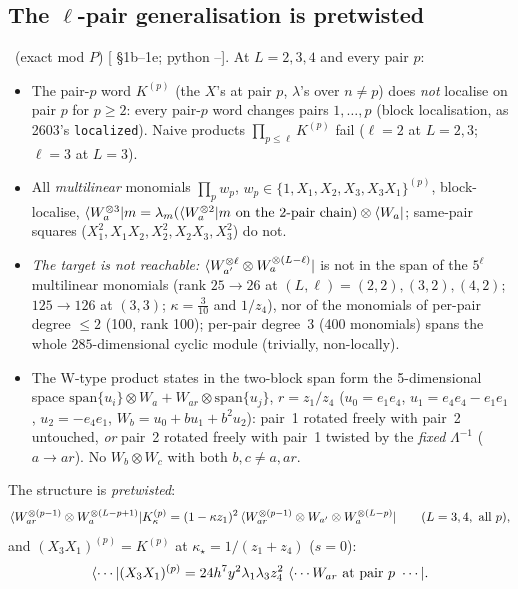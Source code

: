 \subsection{The $\ell$-pair generalisation is pretwisted}\label{sec:kappa-lpairs}

\ex\ (exact mod $P$) [ \S1b--1e; python --]. At $L=2,3,4$ and every pair $p$:
\begin{itemize}
\item The pair-$p$ word $K^{(p)}$ (the $X$'s at pair $p$, $\lambda$'s over $n\ne p$) does \emph{not} localise on pair $p$ for $p\ge2$: every pair-$p$ word changes pairs $1,\dots,p$ (block localisation, as 2603's \texttt{localized}). Naive products $\prod_{p\le\ell}K^{(p)}$ fail ($\ell=2$ at $L=2,3$; $\ell=3$ at $L=3$).
\item All \emph{multilinear} monomials $\prod_pw_p$, $w_p\in\{1,X_1,X_2,X_3,X_3X_1\}^{(p)}$, block-localise, $\bra{W_a^{\otimes3}}m=\lambda_m(\bra{W_a^{\otimes2}}m\ \text{on the 2-pair chain})\otimes\bra{W_a}$; same-pair squares ($X_1^2,X_1X_2,X_2^2,X_2X_3,X_3^2$) do not.
\item \emph{The target is not reachable:} $\langle W_{a'}^{\otimes\ell}\otimes W_a^{\otimes(L-\ell)}|$ is not in the span of the $5^\ell$ multilinear monomials (rank $25\to26$ at $(L,\ell)=(2,2),(3,2),(4,2)$; $125\to126$ at $(3,3)$; $\kappa=\tfrac3{10}$ and $1/z_4$), nor of the monomials of per-pair degree $\le2$ (100, rank 100); per-pair degree~3 (400 monomials) spans the whole $285$-dimensional cyclic module (trivially, non-locally).
\item The W-type product states in the two-block span form the 5-dimensional space $\mathrm{span}\{u_i\}\otimes W_a+W_{ar}\otimes\mathrm{span}\{u_j\}$, $r=z_1/z_4$ ($u_0=e_1e_4$, $u_1=e_4e_4-e_1e_1$, $u_2=-e_4e_1$, $W_b=u_0+bu_1+b^2u_2$): pair~1 rotated freely with pair~2 untouched, \emph{or} pair~2 rotated freely with pair~1 twisted by the \emph{fixed} $\Lambda^{-1}$ ($a\to ar$). No $W_b\otimes W_c$ with both $b,c\ne a,ar$.
\end{itemize}
The structure is \emph{pretwisted}:
\begin{equation}\label{eq:kappa-pretw}
 \langle W_{ar}^{\otimes(p-1)}\otimes W_a^{\otimes(L-p+1)}|K^{(p)}_\kappa=(1-\kappa z_1)^2\,\langle W_{ar}^{\otimes(p-1)}\otimes W_{a'}\otimes W_a^{\otimes(L-p)}|\qquad(L=3,4,\ \text{all }p),
\end{equation}
and $(X_3X_1)^{(p)}=K^{(p)}$ at $\kappa_\star=1/(z_1+z_4)$ ($s=0$):
\begin{equation}
 \bra{\cdots}(X_3X_1)^{(p)}=24h^7y^2\lambda_1\lambda_3z_4^2\ \bra{\cdots W_{ar}\ \text{at pair }p\ \cdots}.
\end{equation}
